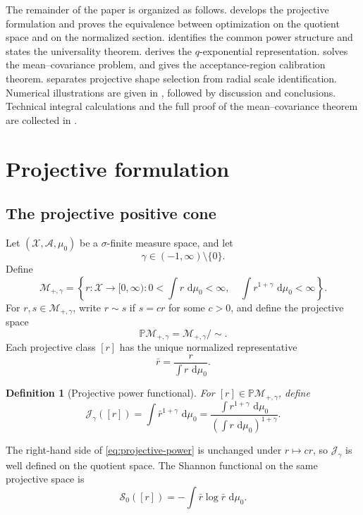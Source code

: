 \documentclass[pdflatex,sn-mathphys-num]{sn-jnl}
\theoremstyle{thmstyleone}
\theoremstyle{thmstyletwo}
\theoremstyle{thmstylethree}
\newtheorem{definition}{Definition}
\newcommand{\dd}{\,\mathrm{d}}
\newcommand{\calX}{\mathcal{X}}
\newcommand{\calM}{\mathcal{M}}
\newcommand{\calS}{\mathcal{S}}
\newcommand{\calJ}{\mathcal{J}}
\begin{document}
The remainder of the paper is organized as follows.  develops the projective formulation and proves the equivalence between optimization on the quotient space and on the normalized section.  identifies the common power structure and states the universality theorem.  derives the $q$-exponential representation.  solves the mean--covariance problem, and  gives the acceptance-region calibration theorem.  separates projective shape selection from radial scale identification. Numerical illustrations are given in , followed by discussion and conclusions. Technical integral calculations and the full proof of the mean--covariance theorem are collected in .

\section{Projective formulation}\label{sec:projective}

\subsection{The projective positive cone}

Let $(\calX,\mathcal A,\mu_0)$ be a $\sigma$-finite measure space, and let
\[
 \gamma\in(-1,\infty)\setminus\{0\}.
\]
Define
\[
\calM_{+,\gamma}
=
\left\{
 r:\calX\to[0,\infty):
 0<\int r\,\dd\mu_0<\infty,
 \quad
 \int r^{1+\gamma}\,\dd\mu_0<\infty
\right\}.
\]
For $r,s\in\calM_{+,\gamma}$, write $r\sim s$ if $s=cr$ for some $c>0$, and define the projective space
\[
 \mathbb P\calM_{+,\gamma}=\calM_{+,\gamma}/\!\sim.
\]
Each projective class $[r]$ has the unique normalized representative
\[
 \bar r=\frac{r}{\int r\,\dd\mu_0}.
\]

\begin{definition}[Projective power functional]\label{def:projective-power}
For $[r]\in\mathbb P\calM_{+,\gamma}$, define
\begin{equation}
\calJ_\gamma([r])
=
\int \bar r^{1+\gamma}\,\dd\mu_0
=
\frac{\int r^{1+\gamma}\,\dd\mu_0}
{\left(\int r\,\dd\mu_0\right)^{1+\gamma}}.
\label{eq:projective-power}
\end{equation}
\end{definition}

The right-hand side of \cref{eq:projective-power} is unchanged under $r\mapsto cr$, so $\calJ_\gamma$ is well defined on the quotient space. The Shannon functional on the same projective space is
\[
 \calS_0([r])=-\int \bar r\log \bar r\,\dd\mu_0.
\]
\end{document}
